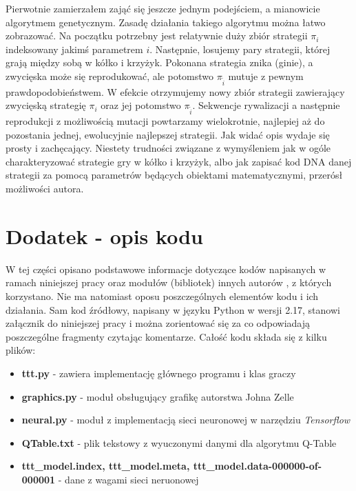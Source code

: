 \documentclass[licencjacka]{pracamgr}
\begin{document}
Pierwotnie zamierzałem zająć się jeszcze jednym podejściem, a mianowicie algorytmem genetycznym. Zasadę działania takiego algorytmu można łatwo zobrazować. Na początku potrzebny jest relatywnie duży zbiór strategii $\pi_{i}$ indeksowany jakimś parametrem $i$. Następnie, losujemy pary strategii, której grają między sobą w kółko i krzyżyk. Pokonana strategia znika (ginie), a zwycięska może się reprodukować, ale potomstwo $\pi_{\tilde{i}}$ mutuje z pewnym prawdopodobieństwem. W efekcie otrzymujemy nowy zbiór strategii zawierający zwycięską strategię $\pi_{i}$ oraz jej potomstwo $\pi_{\tilde{i}}$.  Sekwencje rywalizacji a następnie reprodukcji z możliwością mutacji powtarzamy wielokrotnie, najlepiej aż do pozostania jednej, ewolucyjnie najlepszej strategii. Jak widać opis wydaje się prosty i zachęcający. Niestety trudności związane z wymyśleniem jak w ogóle charakteryzować strategie gry w kółko i krzyżyk, albo jak zapisać kod DNA danej strategii za pomocą parametrów będących obiektami matematycznymi, przerósł możliwości autora. 

\appendix

\chapter{Dodatek - opis kodu}
W tej części opisano podstawowe informacje dotyczące kodów napisanych w ramach niniejszej pracy oraz modułów (bibliotek) innych autorów , z których korzystano.  Nie  ma natomiast oposu poszczególnych elementów kodu i ich działania. Sam kod źródłowy, napisany w języku Python w wersji 2.17, stanowi załącznik do niniejszej pracy i można zorientować się za co odpowiadają poszczególne fragmenty czytając komentarze. Całość kodu składa się z kilku plików:
\begin{itemize}
	\item{\textbf{ttt.py} - zawiera implementację głównego programu i klas graczy}
	\item{\textbf{graphics.py} - moduł obsługujący grafikę autorstwa Johna Zelle \cite{Graphics}}
	\item{\textbf{neural.py} - moduł z implementacją sieci neuronowej w narzędziu \textit{Tensorflow}}
	\item{\textbf{QTable.txt} - plik tekstowy z wyuczonymi danymi dla algorytmu Q-Table}
	\item{ \textbf{ttt\_model.index, ttt\_model.meta, ttt\_model.data-000000-of-000001} - dane z wagami sieci neruonowej}
\end{itemize}
\end{document}
